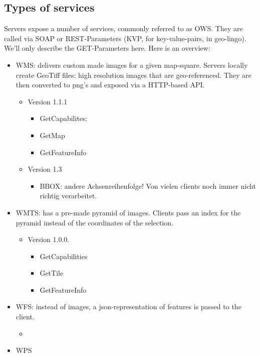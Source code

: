 \subsection{Types of services}
Servers expose a number of services, commonly referred to as OWS. They are called via SOAP or REST-Parameters (KVP, for key-value-pairs, in geo-lingo). We'll only describe the GET-Parameters here. Here is an overview:
\begin{itemize}
    \item WMS: delivers custom made images for a given map-square. Servers locally create GeoTiff files: high resolution images that are geo-referenced. They are then converted to png's and exposed via a HTTP-based API.
    \begin{itemize}
        \item Version 1.1.1
            \begin{itemize}
                \item GetCapabilites: 
                \item GetMap 
                \item GetFeatureInfo
            \end{itemize}
        \item Version 1.3
            \begin{itemize}
                \item BBOX: andere Achsenreihenfolge! Von vielen clients noch immer nicht richtig verarbeitet. 
            \end{itemize}
    \end{itemize}
    
    \item WMTS: has a pre-made pyramid of images. Clients pass an index for the pyramid instead of the coordinates of the selection. 
    \begin{itemize}
        \item Version 1.0.0.
            \begin{itemize}
                \item GetCapabilities 
                \item GetTile 
                \item GetFeatureInfo
            \end{itemize}
    \end{itemize}

    \item WFS: instead of images, a json-representation of features is passed to the client. 
        \begin{itemize}
            \item 
        \end{itemize}

    \item WPS
\end{itemize}

